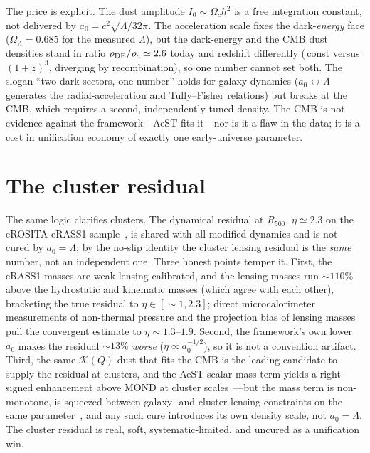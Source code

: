 \documentclass[aps,prd,twocolumn,10pt,nofootinbib,superscriptaddress]{revtex4-2}
\begin{document}
The price is explicit. The dust amplitude $I_0\sim\Omega_c h^2$ is a free integration constant, not delivered by
$a_0=c^2\sqrt{\Lambda/32\pi}$. The acceleration scale fixes the dark-\emph{energy} face ($\Omega_\Lambda=0.685$ for
the measured $\Lambda$), but the dark-energy and the CMB dust densities stand in ratio $\rho_{\rm DE}/\rho_c\simeq2.6$
today and redshift differently ($\,$const versus $(1{+}z)^3$, diverging by recombination), so one number cannot set
both. The slogan ``two dark sectors, one number'' holds for galaxy dynamics ($a_0\leftrightarrow\Lambda$ generates the
radial-acceleration and Tully--Fisher relations) but breaks at the CMB, which requires a second, independently tuned
density. The CMB is not evidence against the framework---AeST fits it---nor is it a flaw in the data; it is a cost in
unification economy of exactly one early-universe parameter.

\section{The cluster residual}
The same logic clarifies clusters. The dynamical residual at $R_{500}$, $\eta\simeq2.3$ on the eROSITA eRASS1
sample~\cite{Bulbul2024}, is shared with all modified dynamics and is not cured by $a_0=\Lambda$; by the no-slip
identity the cluster lensing residual is the \emph{same} number, not an independent one. Three honest points temper
it. First, the eRASS1 masses are weak-lensing-calibrated, and the lensing masses run $\sim110\%$ above the
hydrostatic and kinematic masses (which agree with each other), bracketing the true residual to $\eta\in[\sim1,2.3]$;
direct microcalorimeter measurements of non-thermal pressure and the projection bias of lensing masses pull the
convergent estimate to $\eta\sim1.3$--$1.9$. Second, the framework's own lower $a_0$ makes the residual $\sim13\%$
\emph{worse} ($\eta\propto a_0^{-1/2}$), so it is not a convention artifact. Third, the same $\mathcal{K}(Q)$ dust
that fits the CMB is the leading candidate to supply the residual at clusters, and the AeST scalar mass term yields a
right-signed enhancement above MOND at cluster scales~\cite{Durakovic2024}---but the mass term is non-monotone, is
squeezed between galaxy- and cluster-lensing constraints on the same parameter~\cite{Mistele2023}, and any such cure
introduces its own density scale, not $a_0=\Lambda$. The cluster residual is real, soft, systematic-limited, and
uncured as a unification win.
\end{document}
